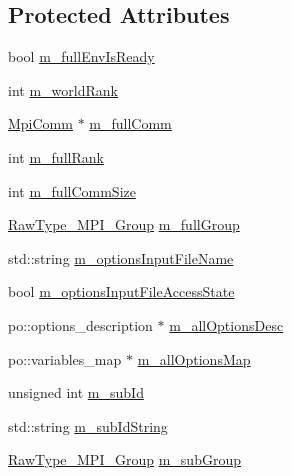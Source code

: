\subsection*{Protected Attributes}
\begin{DoxyCompactItemize}
\item 
bool \hyperlink{class_q_u_e_s_o_1_1_base_environment_a62020b48a3506aa067d1c94c461cb11e}{m\-\_\-full\-Env\-Is\-Ready}
\item 
int \hyperlink{class_q_u_e_s_o_1_1_base_environment_a464cab923ada0e14c6e3a4000c2ea385}{m\-\_\-world\-Rank}
\item 
\hyperlink{class_q_u_e_s_o_1_1_mpi_comm}{Mpi\-Comm} $\ast$ \hyperlink{class_q_u_e_s_o_1_1_base_environment_a8e80c9067b0875c419f1b9ecccbdb46d}{m\-\_\-full\-Comm}
\item 
int \hyperlink{class_q_u_e_s_o_1_1_base_environment_a0bfa53f6bdaec0a6aa3dc00ee2c0101f}{m\-\_\-full\-Rank}
\item 
int \hyperlink{class_q_u_e_s_o_1_1_base_environment_ad5be3e52676db90de1321bc94233c15d}{m\-\_\-full\-Comm\-Size}
\item 
\hyperlink{namespace_q_u_e_s_o_acbf5b0ed9be4b77acd471b3914e128c6}{Raw\-Type\-\_\-\-M\-P\-I\-\_\-\-Group} \hyperlink{class_q_u_e_s_o_1_1_base_environment_ad455ca08c81b8d953e9a8d2bb14d03c3}{m\-\_\-full\-Group}
\item 
std\-::string \hyperlink{class_q_u_e_s_o_1_1_base_environment_a37195909442a817980e1cf8392b9e63d}{m\-\_\-options\-Input\-File\-Name}
\item 
bool \hyperlink{class_q_u_e_s_o_1_1_base_environment_a48ea9a77af61344a313dfd7390b414b4}{m\-\_\-options\-Input\-File\-Access\-State}
\item 
po\-::options\-\_\-description $\ast$ \hyperlink{class_q_u_e_s_o_1_1_base_environment_aac5465b02be108536bda1b5627456c97}{m\-\_\-all\-Options\-Desc}
\item 
po\-::variables\-\_\-map $\ast$ \hyperlink{class_q_u_e_s_o_1_1_base_environment_a2d8e668313b18f57e4607c3bec1ecda2}{m\-\_\-all\-Options\-Map}
\item 
unsigned int \hyperlink{class_q_u_e_s_o_1_1_base_environment_a2aea4a26ea39e72300f7c32594c26012}{m\-\_\-sub\-Id}
\item 
std\-::string \hyperlink{class_q_u_e_s_o_1_1_base_environment_a19243150a58181cbdaf58b1bacd90009}{m\-\_\-sub\-Id\-String}
\item 
\hyperlink{namespace_q_u_e_s_o_acbf5b0ed9be4b77acd471b3914e128c6}{Raw\-Type\-\_\-\-M\-P\-I\-\_\-\-Group} \hyperlink{class_q_u_e_s_o_1_1_base_environment_a6669dac8fb884d4eb3278625f0e8d661}{m\-\_\-sub\-Group}

\end{DoxyCompactItemize}
